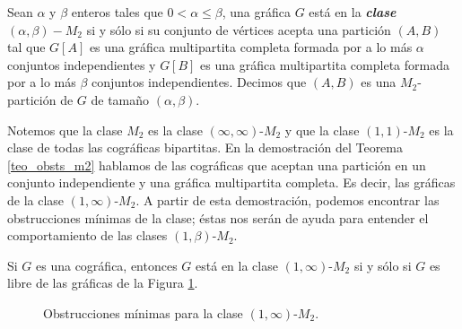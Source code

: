 Sean $\alpha$ y $\beta$ enteros tales que $0 < \alpha \le \beta$, una gr\'afica $G$ est\'a en la \emph{\textbf{clase $(\alpha, \beta)-M_2$}}  si y sólo si su conjunto de vértices acepta una partición $(A,B)$ tal que $G[A]$ es una gráfica multipartita completa formada por a lo más $\alpha$ conjuntos independientes y $G[B]$ es una gráfica multipartita completa formada por a lo más $\beta$ conjuntos independientes. Decimos que $(A,B)$ es una $M_2$-partición de $G$ de tamaño $(\alpha, \beta)$.

Notemos que la clase $M_2$ es la clase $(\infty, \infty)$-$M_2$ y que la clase $(1,1)$-$M_2$ es la clase de todas las cográficas bipartitas. En la demostración del Teorema \ref{teo_obsts_m2} hablamos de las cográficas que aceptan una partición en un conjunto independiente y una gráfica multipartita completa. Es decir, las gráficas de la clase $(1,\infty)$-$M_2$. A partir de esta demostración, podemos encontrar las obstrucciones mínimas de la clase; éstas nos serán de ayuda para entender el comportamiento de las clases $(1,\beta)$-$M_2$.

\begin{lemma}

Si $G$ es una cográfica, entonces $G$ est\'a en la clase $(1,\infty)$-$M_2$
si y sólo si $G$ es libre de las gráficas de la Figura \ref{obsts_1infM2}.

\end{lemma}

\begin{figure}[ht!]
\begin{center}
\end{center}
\setlength{\abovecaptionskip}{-15pt}
\caption{Obstrucciones mínimas para la clase $(1,\infty)$-$M_2$.}
\label{obsts_1infM2}
\end{figure}

